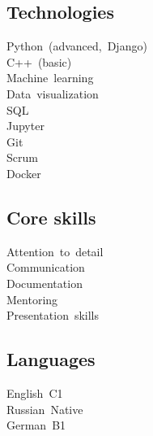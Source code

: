 \documentclass[letterpaper]{deedy-resume} %
\begin{document}
\begin{minipage}[t][0.75\textheight][t]{0.33\textwidth}
\subsection{Technologies}   %
\sectionspace

    Python~(advanced,~Django)
    \\ %
    C++~(basic)
    \\ %
    Machine~learning
    \\ %
    Data~visualization
    \\ %
    SQL
    \\ %
    Jupyter
    \\ %
    Git
    \\ %
    Scrum
    \\ %
    Docker

\sectionspace
\subsection{Core skills}
\sectionspace

    Attention~to~detail
    \\ %
    Communication
    \\ %
    Documentation
    \\ %
    Mentoring
    \\ %
    Presentation~skills

\sectionspace
\subsection{Languages}
\sectionspace

    English~C1
    \\ %
    Russian~Native
    \\ %
    German~B1


\sectionspace %


\end{minipage} %
\hfill
%
%
\end{document}

